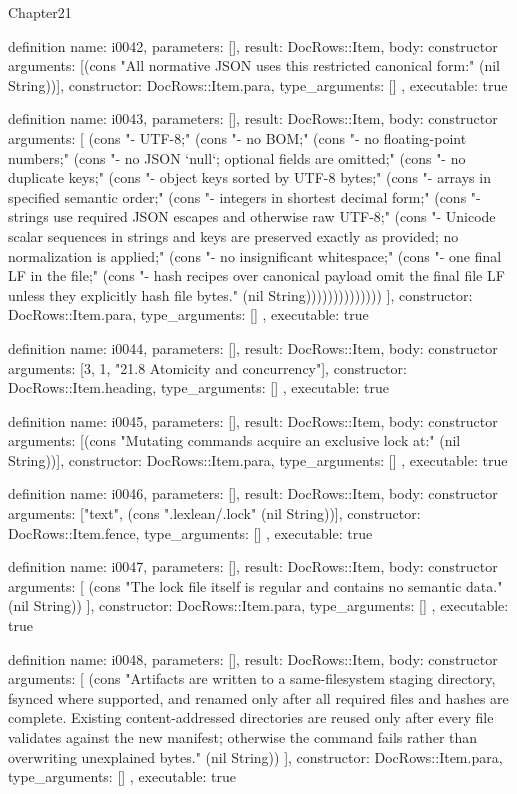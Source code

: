 \begin{lexlean}{Chapter21}
\begin{semanticmodule}
definition{
  name: i0042,
  parameters: [],
  result: DocRows::Item,
  body: constructor{
    arguments: [(cons "All normative JSON uses this restricted canonical form:" (nil String))],
    constructor: DocRows::Item.para,
    type_arguments: []
  },
  executable: true
}

definition{
  name: i0043,
  parameters: [],
  result: DocRows::Item,
  body: constructor{
    arguments: [
      (cons "- UTF-8;" (cons "- no BOM;" (cons "- no floating-point numbers;" (cons "- no JSON `null`; optional fields are omitted;" (cons "- no duplicate keys;" (cons "- object keys sorted by UTF-8 bytes;" (cons "- arrays in specified semantic order;" (cons "- integers in shortest decimal form;" (cons "- strings use required JSON escapes and otherwise raw UTF-8;" (cons "- Unicode scalar sequences in strings and keys are preserved exactly as provided; no normalization is applied;" (cons "- no insignificant whitespace;" (cons "- one final LF in the file;" (cons "- hash recipes over canonical payload omit the final file LF unless they explicitly hash file bytes." (nil String))))))))))))))
    ],
    constructor: DocRows::Item.para,
    type_arguments: []
  },
  executable: true
}

definition{
  name: i0044,
  parameters: [],
  result: DocRows::Item,
  body: constructor{
    arguments: [3, 1, "21.8 Atomicity and concurrency"],
    constructor: DocRows::Item.heading,
    type_arguments: []
  },
  executable: true
}

definition{
  name: i0045,
  parameters: [],
  result: DocRows::Item,
  body: constructor{
    arguments: [(cons "Mutating commands acquire an exclusive lock at:" (nil String))],
    constructor: DocRows::Item.para,
    type_arguments: []
  },
  executable: true
}

definition{
  name: i0046,
  parameters: [],
  result: DocRows::Item,
  body: constructor{
    arguments: ["text", (cons ".lexlean/.lock" (nil String))],
    constructor: DocRows::Item.fence,
    type_arguments: []
  },
  executable: true
}

definition{
  name: i0047,
  parameters: [],
  result: DocRows::Item,
  body: constructor{
    arguments: [
      (cons "The lock file itself is regular and contains no semantic data." (nil String))
    ],
    constructor: DocRows::Item.para,
    type_arguments: []
  },
  executable: true
}

definition{
  name: i0048,
  parameters: [],
  result: DocRows::Item,
  body: constructor{
    arguments: [
      (cons "Artifacts are written to a same-filesystem staging directory, fsynced where supported, and renamed only after all required files and hashes are complete. Existing content-addressed directories are reused only after every file validates against the new manifest; otherwise the command fails rather than overwriting unexplained bytes." (nil String))
    ],
    constructor: DocRows::Item.para,
    type_arguments: []
  },
  executable: true
}


\end{semanticmodule}
\end{lexlean}
